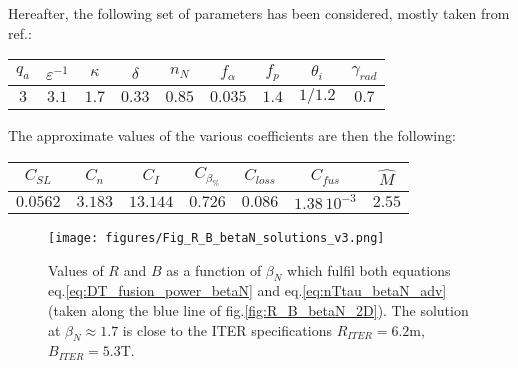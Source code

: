 Hereafter, the following set of parameters has been considered, mostly taken from ref.\cite{Johner2011}:
\begin{center}
	\begin{tabular}{c|c|c|c|c|c|c|c|c}
		\hline
		$q_a$ & $\varepsilon^{-1}$ & $\kappa$ & $\delta$ & $n_N$ & $f_\alpha$ & $f_p$ & $\theta_i$ & $\gamma_{rad}$ \\
		\hline
		$3$   & $3.1$ & $1.7$ & $0.33$ & $0.85$ & $0.035$ & $1.4$ & $1/1.2$ & $0.7$ \\
		\hline	
	\end{tabular}
\end{center}
The approximate values of the various coefficients are then the following:
\begin{center}
	\begin{tabular}{c|c|c|c|c|c|c}
		\hline
		$C_{SL}$ & $C_n$ & $C_I$ & $C_{\beta_\%}$ & $C_{loss}$ & $C_{fus}$ & $\hat M$ \\
		\hline
		$0.0562$ & $3.183$ & $13.144$ & $0.726$ & $0.086$ & $1.38\,10^{-3}$ & $2.55$ \\
		\hline	
	\end{tabular}
\end{center}
\bigskip

\begin{figure} 
	\centering
	\texttt{[image: figures/Fig\_R\_B\_betaN\_solutions\_v3.png]}
	\caption{Values of $R$ and $B$ as a function of $\beta_N$ which fulfil both equations eq.\ref{eq:DT_fusion_power_betaN} and eq.\ref{eq:nTtau_betaN_adv} (taken along the blue line of fig.\ref{fig:R_B_betaN_2D}). The solution at $\beta_N \approx 1.7$ is close to the ITER specifications $R_{ITER}=6.2$m, $B_{ITER}=5.3$T.}
	\label{fig:solutions_betaN}
\end{figure}




